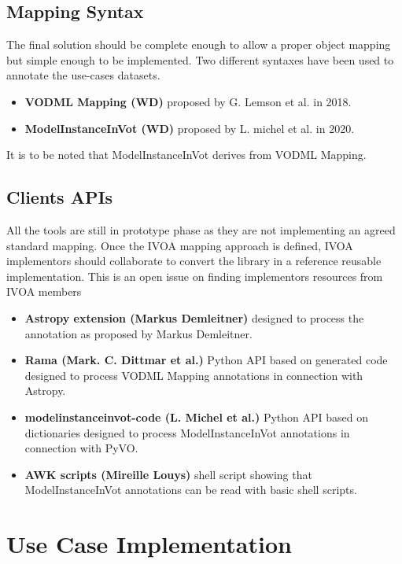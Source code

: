 \documentclass[11pt,a4paper]{ivoa}
\begin{document}
\subsection{Mapping Syntax}

The final solution should be complete enough to
allow a proper object mapping but simple enough to be implemented. 
Two different syntaxes have been used to annotate the use-cases datasets.

\begin{itemize}
\item \textbf{VODML Mapping (WD)} proposed by G. Lemson et al. in 2018.
\item \textbf{ModelInstanceInVot (WD)} proposed by L. michel et al. in 2020.
\end{itemize}

It is to be noted that ModelInstanceInVot derives from VODML Mapping.

\subsection{Clients APIs}

All the tools are still in prototype phase as they are not implementing
an agreed standard mapping. Once the IVOA mapping  approach is defined, IVOA implementors should 
collaborate to convert the library in a reference reusable implementation. This is an open issue on finding implementors
resources from IVOA members

\begin{itemize}
\item \textbf{Astropy extension (Markus Demleitner)}  designed to process the annotation as proposed by Markus Demleitner.
\item \textbf{Rama (Mark. C. Dittmar et al.)} Python API based on generated code designed to process  VODML Mapping annotations in connection with Astropy.
\item \textbf{modelinstanceinvot-code (L. Michel et al.)} Python API based on dictionaries designed to process ModelInstanceInVot annotations in connection with PyVO.
\item \textbf{AWK scripts (Mireille Louys)} shell script showing that ModelInstanceInVot annotations  can be read with basic shell scripts.
\end{itemize}


\section{Use Case Implementation}
\end{document}
